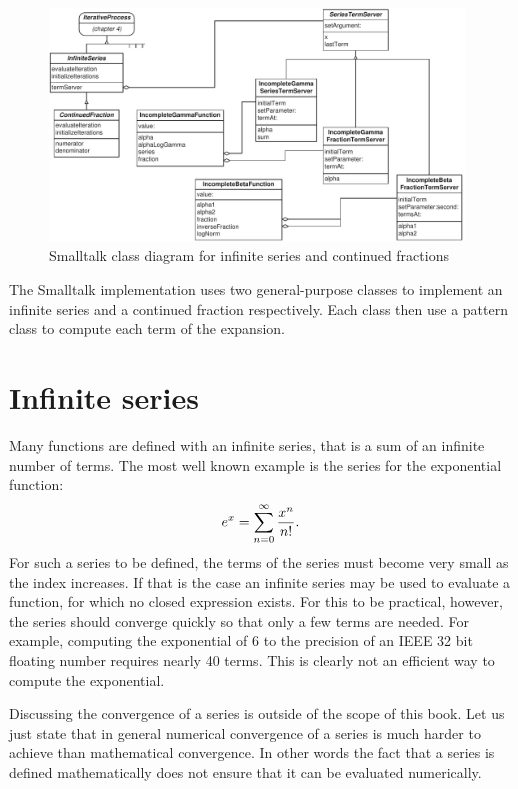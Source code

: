 \documentclass[twoside]{book}
\begin{document}
\begin{figure}
\centering\includegraphics[width=11cm]{Figures/SeriesClassDiagram}
\caption{Smalltalk class diagram for infinite series and continued
fractions}\label{fig:StSeriesClass}
\end{figure}

The Smalltalk implementation uses two general-purpose classes to
implement an infinite series and a continued fraction
respectively. Each class then use a  pattern
class \cite{GoF} to compute each term of the expansion.

\section{Infinite series}
Many functions are defined with an infinite series, that is a sum
of an infinite number of terms. The most well known example is the
series for the exponential function:
\begin{equation}
  e^x=\sum_{n=0}^{\infty}{x^n \over n!}.
\end{equation}
For such a series to be defined, the terms of the series must
become very small as the index increases. If that is the case an
infinite series may be used to evaluate a function, for which no
closed expression exists. For this to be practical, however, the
series should converge quickly so that only a few terms are
needed. For example, computing the exponential of 6 to the
precision of an IEEE 32 bit floating number requires nearly 40
terms. This is clearly not an efficient way to compute the
exponential.

Discussing the convergence of a series is outside of the scope of
this book. Let us just state that in general numerical convergence
of a series is much harder to achieve than mathematical
convergence. In other words the fact that a series is defined
mathematically does not ensure that it can be evaluated
numerically.
\end{document}
